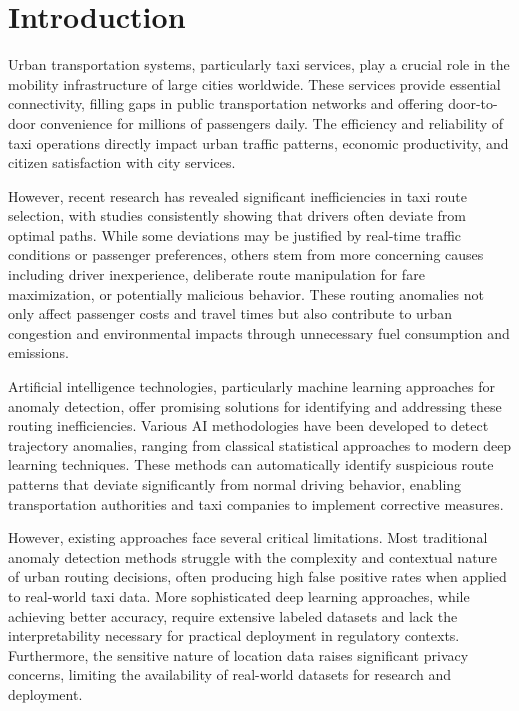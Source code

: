 \documentclass[runningheads]{llncs}
\begin{document}
\section{Introduction}
\label{sec:introduction}

Urban transportation systems, particularly taxi services, play a crucial role in the mobility infrastructure of large cities worldwide. These services provide essential connectivity, filling gaps in public transportation networks and offering door-to-door convenience for millions of passengers daily. The efficiency and reliability of taxi operations directly impact urban traffic patterns, economic productivity, and citizen satisfaction with city services.

However, recent research has revealed significant inefficiencies in taxi route selection, with studies consistently showing that drivers often deviate from optimal paths. While some deviations may be justified by real-time traffic conditions or passenger preferences, others stem from more concerning causes including driver inexperience, deliberate route manipulation for fare maximization, or potentially malicious behavior. These routing anomalies not only affect passenger costs and travel times but also contribute to urban congestion and environmental impacts through unnecessary fuel consumption and emissions.

Artificial intelligence technologies, particularly machine learning approaches for anomaly detection, offer promising solutions for identifying and addressing these routing inefficiencies. Various AI methodologies have been developed to detect trajectory anomalies, ranging from classical statistical approaches to modern deep learning techniques. These methods can automatically identify suspicious route patterns that deviate significantly from normal driving behavior, enabling transportation authorities and taxi companies to implement corrective measures.

However, existing approaches face several critical limitations. Most traditional anomaly detection methods struggle with the complexity and contextual nature of urban routing decisions, often producing high false positive rates when applied to real-world taxi data. More sophisticated deep learning approaches, while achieving better accuracy, require extensive labeled datasets and lack the interpretability necessary for practical deployment in regulatory contexts. Furthermore, the sensitive nature of location data raises significant privacy concerns, limiting the availability of real-world datasets for research and deployment.
\end{document}
